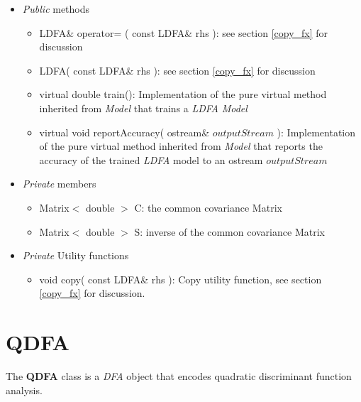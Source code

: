 \documentclass{report}
\begin{document}
\begin{itemize}

\item {\em Public} methods

\begin{itemize}
\item LDFA\& operator= ( const LDFA\& rhs ): see section
      \ref{copy_fx} for discussion
\item LDFA( const LDFA\& rhs ): see section \ref{copy_fx} for
      discussion
\item virtual double train(): Implementation of the pure virtual
      method inherited from {\em Model} that trains a {\em LDFA} {\em
      Model}
\item virtual void reportAccuracy( ostream\& $outputStream$ ):
      Implementation of the pure virtual method inherited from {\em
      Model} that reports the accuracy of the trained {\em LDFA} model
      to an ostream $outputStream$
\end{itemize}

\item {\em Private} members

\begin{itemize}
\item	Matrix$<$ double $>$ C: the common covariance Matrix
\item Matrix$<$ double $>$ S: inverse of the common covariance Matrix
\end{itemize}

\item {\em Private} Utility functions

\begin{itemize}
\item void copy( const LDFA\& rhs ): Copy utility function, see
      section \ref{copy_fx} for discussion.
\end{itemize}

\end{itemize}

\section{QDFA}

The {\bf QDFA} class is a {\em DFA} object that encodes quadratic
discriminant function analysis.
\end{document}
